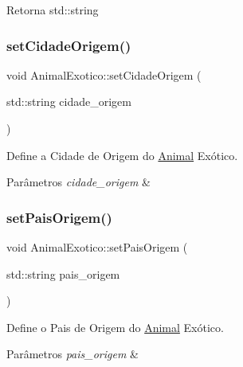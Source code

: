 \begin{DoxyReturn}{Retorna}
std\+::string 
\end{DoxyReturn}
\mbox{\label{classAnimalExotico_abee9fb2e0bfd567a8a0fcb302cf944db}} 
\subsubsection{\texorpdfstring{set\+Cidade\+Origem()}{setCidadeOrigem()}}
{\footnotesize\ttfamily void Animal\+Exotico\+::set\+Cidade\+Origem (\begin{DoxyParamCaption}\item[{std\+::string}]{cidade\+\_\+origem }\end{DoxyParamCaption})}



Define a Cidade de Origem do \hyperlink{classAnimal}{Animal} Exótico. 


\begin{DoxyParams}{Parâmetros}
{\em cidade\+\_\+origem} & \\
\hline
\end{DoxyParams}
\mbox{\label{classAnimalExotico_a2077371fdd8e779a42451a9183d14c63}} 
\subsubsection{\texorpdfstring{set\+Pais\+Origem()}{setPaisOrigem()}}
{\footnotesize\ttfamily void Animal\+Exotico\+::set\+Pais\+Origem (\begin{DoxyParamCaption}\item[{std\+::string}]{pais\+\_\+origem }\end{DoxyParamCaption})}



Define o Pais de Origem do \hyperlink{classAnimal}{Animal} Exótico. 


\begin{DoxyParams}{Parâmetros}
{\em pais\+\_\+origem} & \\
\hline
\end{DoxyParams}


